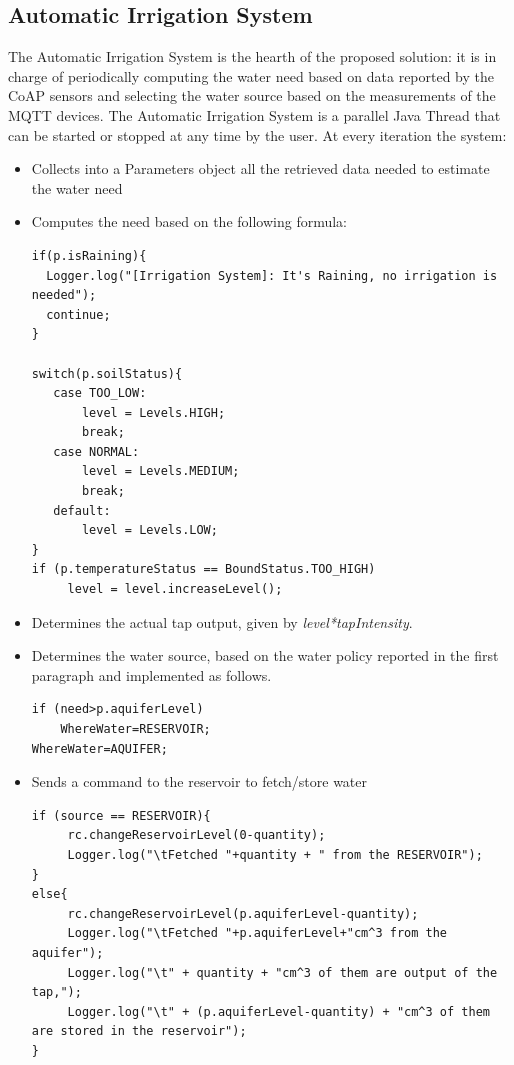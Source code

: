 \subsection{Automatic Irrigation System}
The Automatic Irrigation System is the hearth of the proposed solution: it is in charge of periodically computing the water need based on data reported by the CoAP sensors and selecting the water source based on the measurements of the MQTT devices. The Automatic Irrigation System is a parallel Java Thread that can be started or stopped at any time by the user. At every iteration the system:
\begin{itemize}
	\item Collects into a Parameters object all the retrieved data needed to estimate the water need
	\item Computes the need based on the following formula: 

\begin{lstlisting}
if(p.isRaining){
  Logger.log("[Irrigation System]: It's Raining, no irrigation is needed");
  continue;
}

switch(p.soilStatus){
   case TOO_LOW:
       level = Levels.HIGH;
       break;
   case NORMAL:
       level = Levels.MEDIUM;
       break;
   default:
       level = Levels.LOW;
}
if (p.temperatureStatus == BoundStatus.TOO_HIGH)
     level = level.increaseLevel();

\end{lstlisting}


	\item Determines the actual tap output, given by \textit{level*tapIntensity}.
	\item Determines the water source, based on the water policy reported in the first paragraph and implemented as follows.

\begin{lstlisting}
if (need>p.aquiferLevel)
    WhereWater=RESERVOIR;
WhereWater=AQUIFER;
\end{lstlisting}	
	
	\item Sends a command to the reservoir to fetch/store water
\begin{lstlisting}
if (source == RESERVOIR){
     rc.changeReservoirLevel(0-quantity);
     Logger.log("\tFetched "+quantity + " from the RESERVOIR");
}
else{
     rc.changeReservoirLevel(p.aquiferLevel-quantity);
     Logger.log("\tFetched "+p.aquiferLevel+"cm^3 from the aquifer");
     Logger.log("\t" + quantity + "cm^3 of them are output of the tap,");
     Logger.log("\t" + (p.aquiferLevel-quantity) + "cm^3 of them are stored in the reservoir");
}
\end{lstlisting}
\end{itemize}

